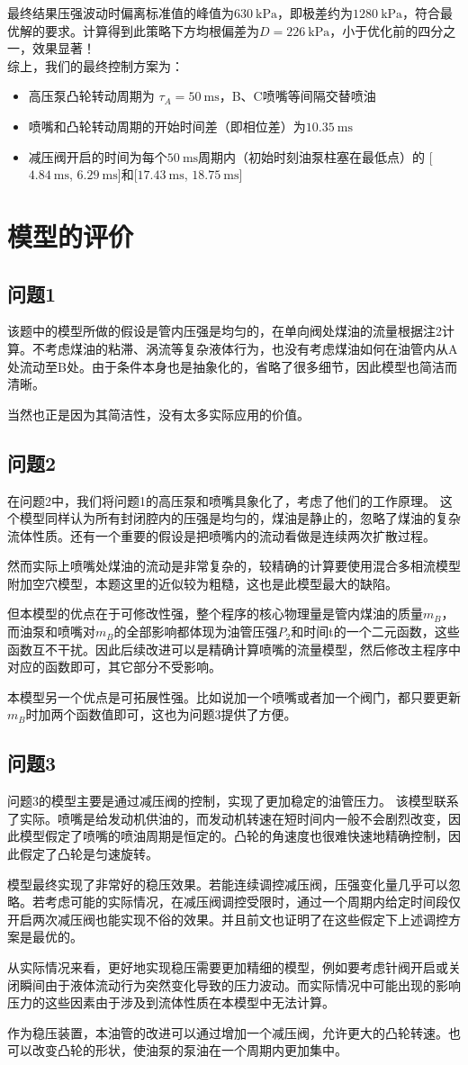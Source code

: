 \documentclass{article}
\newcommand{\pre}{~\mathrm{kPa}}
\newcommand{\tim}{~\mathrm{ms}}
\begin{document}
		最终结果压强波动时偏离标准值的峰值为$630\pre$，即极差约为$1280\pre$，符合最优解的要求。计算得到此策略下方均根偏差为$D=226\pre$，小于优化前的四分之一，效果显著！\\
		
		综上，我们的最终控制方案为：
		\begin{itemize}
			\item 高压泵凸轮转动周期为 $\tau_A=50\tim$，B、C喷嘴等间隔交替喷油
			\item 喷嘴和凸轮转动周期的开始时间差（即相位差）为$10.35\tim$
			\item 减压阀开启的时间为每个$50\tim$周期内（初始时刻油泵柱塞在最低点）的
			[$4.84\tim$, $6.29\tim$]和[$17.43\tim$, $18.75\tim$]
		\end{itemize}
		
\section{模型的评价} %
	\subsection{问题1}
		该题中的模型所做的假设是管内压强是均匀的，在单向阀处煤油的流量根据注2计算。不考虑煤油的粘滞、涡流等复杂液体行为，也没有考虑煤油如何在油管内从A处流动至B处。由于条件本身也是抽象化的，省略了很多细节，因此模型也简洁而清晰。
		
		当然也正是因为其简洁性，没有太多实际应用的价值。
	\subsection{问题2}
		在问题2中，我们将问题1的高压泵和喷嘴具象化了，考虑了他们的工作原理。
		这个模型同样认为所有封闭腔内的压强是均匀的，煤油是静止的，忽略了煤油的复杂流体性质。还有一个重要的假设是把喷嘴内的流动看做是连续两次扩散过程。
		
		然而实际上喷嘴处煤油的流动是非常复杂的，较精确的计算要使用混合多相流模型附加空穴模型，本题这里的近似较为粗糙，这也是此模型最大的缺陷。
		
		但本模型的优点在于可修改性强，整个程序的核心物理量是管内煤油的质量$m_B$，而油泵和喷嘴对$m_B$的全部影响都体现为油管压强$P_2$和时间t的一个二元函数，这些函数互不干扰。因此后续改进可以是精确计算喷嘴的流量模型，然后修改主程序中对应的函数即可，其它部分不受影响。
		
		本模型另一个优点是可拓展性强。比如说加一个喷嘴或者加一个阀门，都只要更新$m_B$时加两个函数值即可，这也为问题3提供了方便。
	\subsection{问题3}
		问题3的模型主要是通过减压阀的控制，实现了更加稳定的油管压力。
		该模型联系了实际。喷嘴是给发动机供油的，而发动机转速在短时间内一般不会剧烈改变，因此模型假定了喷嘴的喷油周期是恒定的。凸轮的角速度也很难快速地精确控制，因此假定了凸轮是匀速旋转。
		
		模型最终实现了非常好的稳压效果。若能连续调控减压阀，压强变化量几乎可以忽略。若考虑可能的实际情况，在减压阀调控受限时，通过一个周期内给定时间段仅开启两次减压阀也能实现不俗的效果。并且前文也证明了在这些假定下上述调控方案是最优的。
		
		从实际情况来看，更好地实现稳压需要更加精细的模型，例如要考虑针阀开启或关闭瞬间由于液体流动行为突然变化导致的压力波动。而实际情况中可能出现的影响压力的这些因素由于涉及到流体性质在本模型中无法计算。
		
		作为稳压装置，本油管的改进可以通过增加一个减压阀，允许更大的凸轮转速。也可以改变凸轮的形状，使油泵的泵油在一个周期内更加集中。
\end{document}
